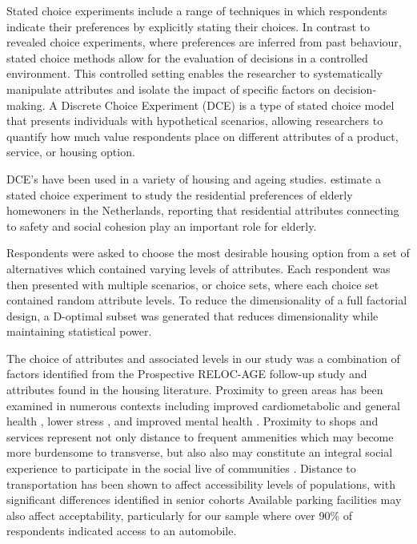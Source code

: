 \documentclass[3p,11pt ]{elsarticle}
\begin{document}
Stated choice experiments include a range of techniques in which respondents indicate their preferences by explicitly stating their choices.
In contrast to revealed choice experiments, where preferences are inferred from past behaviour, stated choice methods allow for the evaluation of decisions in a controlled environment.
This controlled setting enables the researcher to systematically manipulate attributes and isolate the impact of specific factors on decision-making.
A Discrete Choice Experiment (DCE) is a type of stated choice model that presents individuals with hypothetical scenarios, allowing researchers to quantify how much value respondents place on different attributes of a product, service, or housing option.

DCE's have been used in a variety of housing and ageing studies.
\cite{ossokinaBestLivingConcepts2020} estimate a stated choice experiment to study the residential preferences of elderly homewoners in the Netherlands,
reporting that residential attributes connecting to safety and social cohesion play an important role for elderly.
\cite{ossokinaReferencedependentHousingChoice2022a}


Respondents were asked to choose the most desirable housing option from a set of alternatives which contained varying levels of attributes.
Each respondent was then presented with multiple scenarios, or choice sets,
where each choice set contained random attribute levels.
To reduce the dimensionality of a full factorial design, a D-optimal subset was generated that reduces dimensionality while maintaining statistical power.


The choice of attributes and associated levels in our study was a combination of factors identified from the Prospective RELOC-AGE follow-up study and attributes found in the housing literature.
Proximity to green areas has been examined in numerous contexts including improved cardiometabolic and general health \citep{paquetAreAccessibilityCharacteristics2013,  maasGreenSpaceUrbanity2006},
lower stress \citep{nielsenGreenAreasAffect2007},
and improved mental health \citep{cohen-clineAccessGreenSpace2015,sturmProximityUrbanParks2014}.
Proximity to shops and services represent not only distance to frequent ammenities which may become more burdensome to transverse,
but also also may constitute an integral social experience to participate in the social live of communities
\citep{lucasMethodEvaluateEquitable2016}.
Distance to transportation has been shown to affect  accessibility levels of populations,
with significant differences identified in senior cohorts \citep{ricciardiExploringPublicTransport2015,hildebrandDimensionsElderlyTravel2003,alsnihMobilityAccessibilityExpectations2003}
Available parking facilities may also affect acceptability,
particularly for our sample where over 90\% of respondents indicated access to an automobile.
\end{document}
